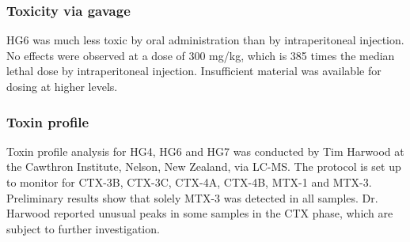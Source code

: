 \documentclass[12pt]{article}
\begin{document}
\subsubsection{Toxicity via gavage}
 HG6 was much less toxic by oral administration than by intraperitoneal injection. No effects were observed at a dose of 300 mg/kg, which is 385 times the median lethal dose by intraperitoneal injection. Insufficient material was available for dosing at higher levels.​



\subsubsection{Toxin profile}
Toxin profile analysis for HG4, HG6 and HG7 was conducted by Tim Harwood at the Cawthron Institute, Nelson, New Zealand, via LC-MS. The protocol is set up to monitor for CTX-3B, CTX-3C, CTX-4A, CTX-4B, MTX-1 and MTX-3. Preliminary results show that solely MTX-3 was detected in all samples. Dr. Harwood reported unusual peaks in some samples in the CTX phase, which are subject to further investigation. \\

\newpage
\end{document}
